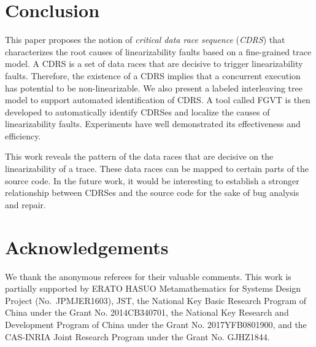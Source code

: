 \documentclass[runningheads]{llncs}
\begin{document}
\section{Conclusion}\label{sec:conclusion}
This paper proposes the notion of \textit{critical data race sequence} (\textit{CDRS}) that characterizes the root causes of linearizability faults based on a fine-grained trace model. A CDRS is a set of data races that are decisive to trigger linearizability faults. Therefore, the existence of a CDRS implies that a concurrent execution has potential to be non-linearizable. We also present a labeled interleaving tree model to support automated identification of CDRS. A tool called FGVT is then developed to automatically identify CDRSes and localize the causes of linearizability faults. Experiments have well demonstrated its effectiveness and efficiency.

This work reveals the pattern of the data races that are decisive on the linearizability of a trace. These data races can be mapped to certain parts of the source code. In the future work, it would be interesting to establish a stronger relationship between CDRSes and the source code for the sake of bug analysis and repair.

\section*{Acknowledgements}\label{sec:acknowledgement}

We thank the anonymous referees for their valuable comments. This work is partially supported by ERATO HASUO Metamathematics for Systems Design Project (No.~{JPMJER1603}), JST, the National Key Basic Research Program of China under the Grant No. 2014CB340701, the National Key Research and Development Program of China under the Grant No. 2017YFB0801900, and the CAS-INRIA Joint Research Program under the Grant No. GJHZ1844.

%
%
 
 
%
\end{document}
